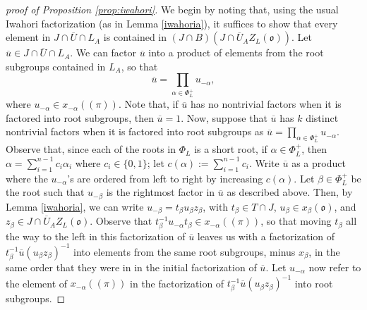 \documentclass[11pt,letterpaper]{article}
\newcommand{\goth}{\mathfrak}
\theoremstyle{remark}
\numberwithin{equation}{section}
\begin{document}
\begin{proof}[proof of Proposition \ref{prop:iwahori}]
We begin by noting that, using the usual Iwahori factorization (as in Lemma \ref{iwahoria}), it suffices to show that every element in $J \cap \overline{U} \cap L_A$ is contained in $(J \cap B)(J\cap \overline{U}_AZ_L(\goth{o}))$. Let $\overline{u} \in J \cap \overline{U} \cap L_A$. We can factor $\overline{u}$ into a product of elements from the root subgroups contained in $L_A$, so that $$\overline{u} = \prod_{\alpha \in \Phi_L^+} u_{-\alpha},$$ where $u_{-\alpha} \in x_{-\alpha}((\pi))$. Note that, if $\overline{u}$ has no nontrivial factors when it is factored into root subgroups, then $\overline{u} = 1$. Now, suppose that $\overline{u}$ has $k$ distinct nontrivial factors when it is factored into root subgroups as $\overline{u} = \prod_{\alpha \in \Phi_L^+} u_{-\alpha}$. Observe that, since each of the roots in $\Phi_L$ is a short root, if $\alpha \in \Phi_L^+$, then $\alpha = \sum_{i=1}^{n-1} c_i\alpha_i$ where $c_i \in \{0,1\}$; let $c(\alpha) := \sum_{i=1}^{n-1} c_i$. Write $\overline{u}$ as a product where the $u_{-\alpha}$'s are ordered from left to right by increasing $c(\alpha)$. Let $\beta \in \Phi_L^+$ be the root such that $u_{-\beta}$ is the rightmost factor in $\overline{u}$ as described above. Then, by Lemma \ref{iwahoria}, we can write $u_{-\beta} = t_{\beta}u_{\beta}z_{\beta}$, with $t_{\beta} \in T\cap J$, $u_{\beta} \in x_{\beta}(\goth{o})$, and $z_{\beta} \in J \cap \overline{U}_AZ_L(\goth{o})$. Observe that $t_{\beta}^{-1}u_{-\alpha}t_{\beta} \in x_{-\alpha}((\pi))$, so that moving $t_{\beta}$ all the way to the left in this factorization of $\overline{u}$ leaves us with a factorization of $t_{\beta}^{-1}\overline{u}(u_{\beta}z_{\beta})^{-1}$ into elements from the same root subgroups, minus $x_{\beta}$, in the same order that they were in in the initial factorization of $\overline{u}$. Let $u_{-\alpha}$ now refer to the element of $x_{-\alpha}((\pi))$ in the factorization of $t_{\beta}^{-1}\overline{u}(u_{\beta}z_{\beta})^{-1}$ into root subgroups.





\end{proof}
\end{document}
